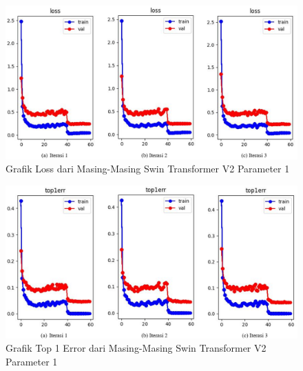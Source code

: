 \begin{figure}[ht]
  \centering
  \includegraphics[scale=0.55]{gambar/Train SwinV2 Loss.png}
  \caption{Grafik Loss dari Masing-Masing Swin Transformer V2 Parameter 1}
  \label{fig:grafiklossdantop1errdariprosestrainingdanvalidationswinv2iterasi1}
\end{figure}

\begin{figure}[ht]
  \centering
  \includegraphics[scale=0.55]{gambar/Train SwinV2 Top1Err.png}
  \caption{Grafik Top 1 Error dari Masing-Masing Swin Transformer V2 Parameter 1}
  \label{fig:grafiklossdantop1errdariprosestrainingdanvalidationswinv2iterasi2}
\end{figure}


